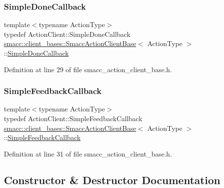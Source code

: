 \subsubsection{\texorpdfstring{Simple\+Done\+Callback}{SimpleDoneCallback}}
{\footnotesize\ttfamily template$<$typename Action\+Type$>$ \\
typedef Action\+Client\+::\+Simple\+Done\+Callback \hyperlink{classsmacc_1_1client__bases_1_1SmaccActionClientBase}{smacc\+::client\+\_\+bases\+::\+Smacc\+Action\+Client\+Base}$<$ Action\+Type $>$\+::\hyperlink{classsmacc_1_1client__bases_1_1SmaccActionClientBase_a56eb842a85c65248fda43909b1aaeac1}{Simple\+Done\+Callback}}



Definition at line 29 of file smacc\+\_\+action\+\_\+client\+\_\+base.\+h.

\mbox{\label{classsmacc_1_1client__bases_1_1SmaccActionClientBase_a207f1655464affc35459f47a35d04069}} 
\subsubsection{\texorpdfstring{Simple\+Feedback\+Callback}{SimpleFeedbackCallback}}
{\footnotesize\ttfamily template$<$typename Action\+Type$>$ \\
typedef Action\+Client\+::\+Simple\+Feedback\+Callback \hyperlink{classsmacc_1_1client__bases_1_1SmaccActionClientBase}{smacc\+::client\+\_\+bases\+::\+Smacc\+Action\+Client\+Base}$<$ Action\+Type $>$\+::\hyperlink{classsmacc_1_1client__bases_1_1SmaccActionClientBase_a207f1655464affc35459f47a35d04069}{Simple\+Feedback\+Callback}}



Definition at line 31 of file smacc\+\_\+action\+\_\+client\+\_\+base.\+h.



\subsection{Constructor \& Destructor Documentation}
\mbox{\label{classsmacc_1_1client__bases_1_1SmaccActionClientBase_af38f27dd26f8a87fea6b3eaa4a84e604}} 
